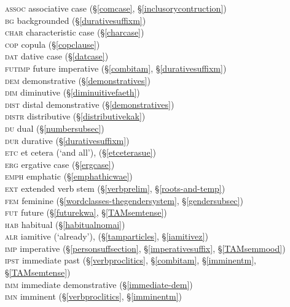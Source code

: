 \begin{tabbing}
	\textsc{assoc} \> {associative case (\S\ref{comcase}, \S\ref{inclusorycontruction})}\\
	\textsc{bg} \> {backgrounded (\S\ref{durativesuffixm})}\\
	\textsc{char} \> {characteristic case (\S\ref{charcase})}\\
	\textsc{cop} \> {copula (\S\ref{copclause})}\\
	\textsc{dat} \> {dative case (\S\ref{datcase})}\\
	\textsc{futimp} \> {future imperative (\S\ref{combitam}, \S\ref{durativesuffixm})}\\
	\textsc{dem} \> {demonstrative (\S\ref{demonstratives})}\\
	\textsc{dim} \> {diminutive (\S\ref{diminuitivefaeth})}\\
	\textsc{dist} \> {distal demonstrative (\S\ref{demonstratives})}\\
	\textsc{distr} \> {distributive (\S\ref{distributivekak})}\\
	\textsc{du} \> {dual (\S\ref{numbersubsec})}\\
	\textsc{dur} \> {durative (\S\ref{durativesuffixm})}\\
	\textsc{etc} \> {et cetera (`and all'), (\S\ref{etceterasue})}\\
	\textsc{erg} \> {ergative case (\S\ref{ergcase})}\\
	\textsc{emph} \> {emphatic (\S\ref{emphathicwae})}\\
	\textsc{ext} \> {extended verb stem (\S\ref{verbprelim}, \S\ref{roots-and-temp})}\\
	\textsc{fem} \> {feminine (\S\ref{wordclasses-thegendersystem}, \S\ref{gendersubsec})}\\
	\textsc{fut} \> {future (\S\ref{futurekwa}, \S\ref{TAMsemtense})}\\
	\textsc{hab} \> {habitual (\S\ref{habitualnomai})}\\
	\textsc{alr} \> {iamitive (`already'), (\S\ref{tamparticles}, \S\ref{iamitivez})}\\
	\textsc{imp} \> {imperative (\S\ref{personsuffsection}, \S\ref{imperativesuffix}, \S\ref{TAMsemmood})}\\
	\textsc{ipst} \> {immediate past (\S\ref{verbproclitics}, \S\ref{combitam}, \S\ref{imminentm}, \S\ref{TAMsemtense})}\\
	\textsc{imm} \> {immediate demonstrative (\S\ref{immediate-dem})}\\
	\textsc{imn} \> {imminent (\S\ref{verbproclitics}, \S\ref{imminentm})}\\

\end{tabbing}
